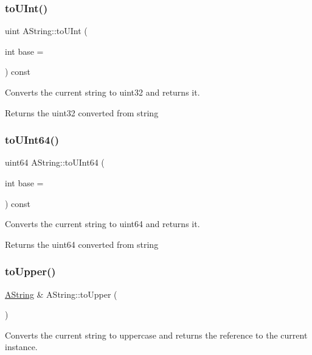 \subsubsection{\texorpdfstring{toUInt()}{toUInt()}}
{\footnotesize\ttfamily uint A\+String\+::to\+U\+Int (\begin{DoxyParamCaption}\item[{int}]{base = {} }\end{DoxyParamCaption}) const}



Converts the current string to uint32 and returns it. 

\begin{DoxyReturn}{Returns}
the uint32 converted from string 
\end{DoxyReturn}
\mbox{\label{class_a_string_a92130012ffd32a72fe43750592e70ef5}} 
\subsubsection{\texorpdfstring{toUInt64()}{toUInt64()}}
{\footnotesize\ttfamily uint64 A\+String\+::to\+U\+Int64 (\begin{DoxyParamCaption}\item[{int}]{base = {} }\end{DoxyParamCaption}) const}



Converts the current string to uint64 and returns it. 

\begin{DoxyReturn}{Returns}
the uint64 converted from string 
\end{DoxyReturn}
\mbox{\label{class_a_string_af4def080314da5a03fcead8b7cf822bc}} 
\subsubsection{\texorpdfstring{toUpper()}{toUpper()}}
{\footnotesize\ttfamily \mbox{\hyperlink{class_a_string}{A\+String}} \& A\+String\+::to\+Upper (\begin{DoxyParamCaption}{ }\end{DoxyParamCaption})}



Converts the current string to uppercase and returns the reference to the current instance. 

